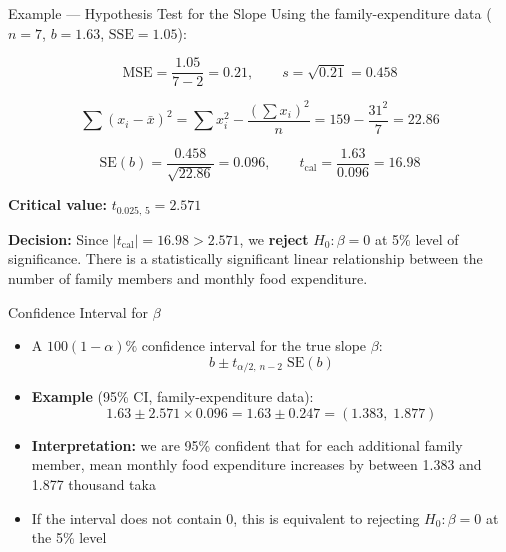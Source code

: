 \documentclass[12pt, aspectratio=169]{beamer}
\begin{document}
    \begin{frame}{Example --- Hypothesis Test for the Slope}
        Using the family-expenditure data ($n = 7$, $b = 1.63$, $\text{SSE} = 1.05$):

        \[
            \text{MSE} = \frac{1.05}{7-2} = 0.21,
            \qquad
            s = \sqrt{0.21} = 0.458
        \]

        \[
            \sum(x_i - \bar{x})^2 = \sum x_i^2 - \frac{(\sum x_i)^2}{n}
            = 159 - \frac{31^2}{7} = 22.86
        \]

        \[
            \mathrm{SE}(b) = \frac{0.458}{\sqrt{22.86}} = 0.096,
            \qquad
            t_{\text{cal}} = \frac{1.63}{0.096} = 16.98
        \]

        \textbf{Critical value:} $t_{0.025,\,5} = 2.571$

        \vspace{0.25em}

        \textbf{Decision:} Since $|t_{\text{cal}}| = 16.98 > 2.571$, we
        \textbf{reject} $H_0: \beta = 0$ at 5\% level of significance. There is a statistically significant linear relationship between the number of family members and monthly food expenditure.
    \end{frame}


    \begin{frame}{Confidence Interval for $\beta$}
        \begin{itemize}
            \item A $100(1-\alpha)\%$ confidence interval for the true slope $\beta$:
                \[
                    b \pm t_{\alpha/2,\,n-2}\;\mathrm{SE}(b)
                \]
            \item \textbf{Example} (95\% CI, family-expenditure data):
                \[
                    1.63 \pm 2.571 \times 0.096 = 1.63 \pm 0.247
                    = (1.383,\;1.877)
                \]
            \item \textbf{Interpretation:} we are 95\% confident that for each
                additional family member, mean monthly food expenditure increases
                by between 1.383 and 1.877 thousand taka
            \item If the interval does not contain 0, this is equivalent to
                rejecting $H_0: \beta = 0$ at the 5\% level
        \end{itemize}
    \end{frame}


\end{document}
